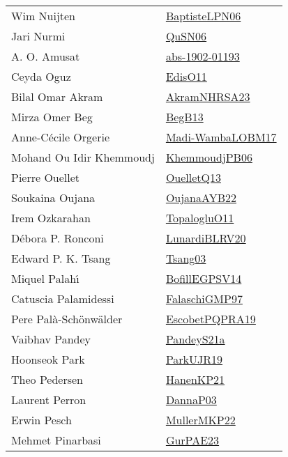 {\begin{longtable}{p{4cm}p{20cm}}
Wim Nuijten & \href{}{BaptisteLPN06}\cite{BaptisteLPN06} \\
Jari Nurmi & \href{papers/QuSN06.pdf}{QuSN06}\cite{QuSN06} \\
A. O. Amusat & \href{articles/abs-1902-01193.pdf}{abs-1902-01193}\cite{abs-1902-01193} \\
Ceyda Oguz & \href{papers/EdisO11.pdf}{EdisO11}\cite{EdisO11} \\
Bilal Omar Akram & \href{articles/AkramNHRSA23.pdf}{AkramNHRSA23}\cite{AkramNHRSA23} \\
Mirza Omer Beg & \href{articles/BegB13.pdf}{BegB13}\cite{BegB13} \\
Anne{-}C{\'{e}}cile Orgerie & \href{papers/Madi-WambaLOBM17.pdf}{Madi-WambaLOBM17}\cite{Madi-WambaLOBM17} \\
Mohand Ou Idir Khemmoudj & \href{papers/KhemmoudjPB06.pdf}{KhemmoudjPB06}\cite{KhemmoudjPB06} \\
Pierre Ouellet & \href{papers/OuelletQ13.pdf}{OuelletQ13}\cite{OuelletQ13} \\
Soukaina Oujana & \href{papers/OujanaAYB22.pdf}{OujanaAYB22}\cite{OujanaAYB22} \\
Irem Ozkarahan & \href{articles/TopalogluO11.pdf}{TopalogluO11}\cite{TopalogluO11} \\
D{\'{e}}bora P. Ronconi & \href{articles/LunardiBLRV20.pdf}{LunardiBLRV20}\cite{LunardiBLRV20} \\
Edward P. K. Tsang & \href{articles/Tsang03.pdf}{Tsang03}\cite{Tsang03} \\
Miquel Palah{\'{\i}} & \href{papers/BofillEGPSV14.pdf}{BofillEGPSV14}\cite{BofillEGPSV14} \\
Catuscia Palamidessi & \href{articles/FalaschiGMP97.pdf}{FalaschiGMP97}\cite{FalaschiGMP97} \\
Pere Pal{\`{a}}{-}Sch{\"{o}}nw{\"{a}}lder & \href{articles/EscobetPQPRA19.pdf}{EscobetPQPRA19}\cite{EscobetPQPRA19} \\
Vaibhav Pandey & \href{articles/PandeyS21a.pdf}{PandeyS21a}\cite{PandeyS21a} \\
Hoonseok Park & \href{papers/ParkUJR19.pdf}{ParkUJR19}\cite{ParkUJR19} \\
Theo Pedersen & \href{papers/HanenKP21.pdf}{HanenKP21}\cite{HanenKP21} \\
Laurent Perron & \href{papers/DannaP03.pdf}{DannaP03}\cite{DannaP03} \\
Erwin Pesch & \href{articles/MullerMKP22.pdf}{MullerMKP22}\cite{MullerMKP22} \\
Mehmet Pinarbasi & \href{articles/GurPAE23.pdf}{GurPAE23}\cite{GurPAE23} \\

\end{longtable}}
